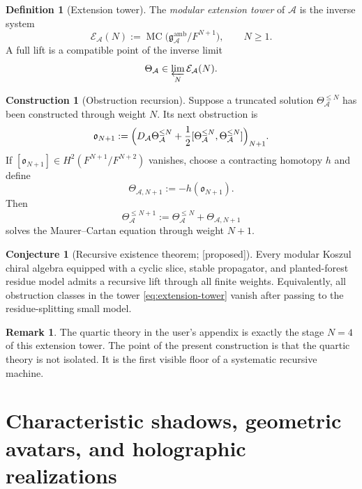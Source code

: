 \documentclass[11pt,oneside]{memoir}
\numberwithin{equation}{chapter}
\theoremstyle{definition}
\newtheorem{definition}[theorem]{Definition}
\newtheorem{construction}[theorem]{Construction}
\newtheorem{conjecture}[theorem]{Conjecture}
\newtheorem{remark}[theorem]{Remark}
\newcommand{\ClaimStatusConjectured}{\textnormal{[proposed]}}
\newcommand{\cA}{\mathcal A}
\newcommand{\cE}{\mathcal E}
\newcommand{\fg}{\mathfrak g}
\newcommand{\MC}{\operatorname{MC}}
\begin{document}
\begin{definition}[Extension tower]
\label{def:extension-tower}
The \emph{modular extension tower} of \(\cA\) is the inverse system
\begin{equation}
\label{eq:extension-tower}
\cE_{\cA}(N):=\MC\bigl(\fg^{\mathrm{amb}}_{\cA}/F^{N+1}\bigr),
\qquad N\ge 1.
\end{equation}
A full lift is a compatible point of the inverse limit
\[
\Theta_{\cA}\in \varprojlim_N \cE_{\cA}(N).
\]
\end{definition}

\begin{construction}[Obstruction recursion]
\label{constr:obstruction-recursion}
Suppose a truncated solution \(\Theta_{\cA}^{\le N}\) has been constructed through weight \(N\).  Its next obstruction is
\begin{equation}
\label{eq:next-obstruction}
\mathfrak o_{N+1}
:=
\Bigl(D_{\cA}\Theta_{\cA}^{\le N}+\frac12[\Theta_{\cA}^{\le N},\Theta_{\cA}^{\le N}]\Bigr)_{N+1}.
\end{equation}
If \([\mathfrak o_{N+1}]\in H^2(F^{N+1}/F^{N+2})\) vanishes, choose a contracting homotopy \(h\) and define
\begin{equation}
\label{eq:recursive-lift-formula}
\Theta_{\cA,N+1}:=-h(\mathfrak o_{N+1}).
\end{equation}
Then
\[
\Theta_{\cA}^{\le N+1}:=\Theta_{\cA}^{\le N}+\Theta_{\cA,N+1}
\]
solves the Maurer--Cartan equation through weight \(N+1\).
\end{construction}

\begin{conjecture}[Recursive existence theorem; \ClaimStatusConjectured]
\label{conj:recursive-existence}
Every modular Koszul chiral algebra equipped with a cyclic slice, stable propagator, and planted-forest residue model admits a recursive lift through all finite weights.  Equivalently, all obstruction classes in the tower \eqref{eq:extension-tower} vanish after passing to the residue-splitting small model.
\end{conjecture}

\begin{remark}
The quartic theory in the user's appendix is exactly the stage \(N=4\) of this extension tower.  The point of the present construction is that the quartic theory is not isolated.  It is the first visible floor of a systematic recursive machine.
\end{remark}

\chapter{Characteristic shadows, geometric avatars, and holographic realizations}
\label{chap:characteristic-realizations}
\end{document}
